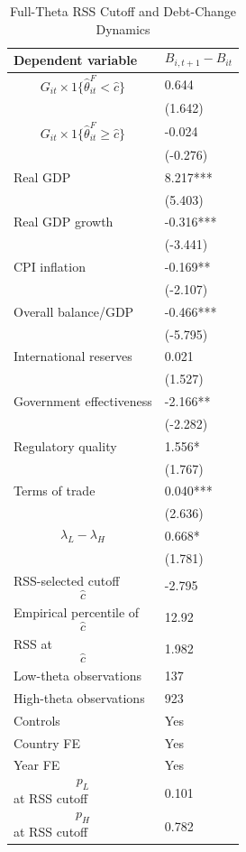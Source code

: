 \begin{table}[H]\centering
\begin{threeparttable}
\caption{Full-Theta RSS Cutoff and Debt-Change Dynamics}
\label{tab:deltaB_rss_cutoff_fulltheta}
\scriptsize
\begin{tabularx}{\textwidth}{lY}
\toprule
Dependent variable & $$B_{i,t+1}-B_{it}$$ \\
\midrule
$$G_{it}\times 1\{\widehat{\theta}^{F}_{it}<\widehat{c}\}$$ & 0.644 \\
 & (1.642) \\
$$G_{it}\times 1\{\widehat{\theta}^{F}_{it}\geq\widehat{c}\}$$ & -0.024 \\
 & (-0.276) \\
Real GDP & 8.217*** \\
 & (5.403) \\
Real GDP growth & -0.316*** \\
 & (-3.441) \\
CPI inflation & -0.169** \\
 & (-2.107) \\
Overall balance/GDP & -0.466*** \\
 & (-5.795) \\
International reserves & 0.021 \\
 & (1.527) \\
Government effectiveness & -2.166** \\
 & (-2.282) \\
Regulatory quality & 1.556* \\
 & (1.767) \\
Terms of trade & 0.040*** \\
 & (2.636) \\
$$\lambda_L-\lambda_H$$ & 0.668* \\
 & (1.781) \\
\midrule
RSS-selected cutoff $$\widehat{c}$$ & -2.795 \\
Empirical percentile of $$\widehat{c}$$ & 12.92 \\
RSS at $$\widehat{c}$$ & 1.982 \\
Low-theta observations & 137 \\
High-theta observations & 923 \\
Controls & Yes \\
Country FE & Yes \\
Year FE & Yes \\
$$p_L$$ at RSS cutoff & 0.101 \\
$$p_H$$ at RSS cutoff & 0.782 \\

\end{tabularx}
\end{threeparttable}
\end{table}
